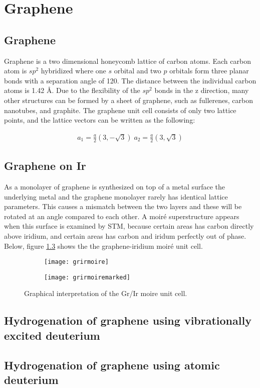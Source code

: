 \chapter{Graphene}

\section{Graphene}

Graphene is a two dimensional honeycomb lattice of carbon atoms. Each carbon atom is $sp^2$ hybridized where one $s$ orbital and two $p$ orbitals form three planar bonds with a separation angle of 120\degree. The distance between the individual carbon atoms is 1.42 Å. Due to the flexibility of the $sp^2$ bonds in the z direction, many other structures can be formed by a sheet of graphene, such as fullerenes, carbon nanotubes, and graphite. The graphene unit cell consists of only two lattice points, and the lattice vectors can be written as the following:

\begin{align*}
  a_1 = \frac{a}{2}(3,-\sqrt{3}) \; a_2 = \frac{a}{2}(3,\sqrt{3})
\end{align*}

\section{Graphene on Ir}

As a monolayer of graphene is synthesized on top of a metal surface the underlying metal and the graphene monolayer rarely has identical lattice parameters. This causes a mismatch between the two layers and these will be rotated at an angle compared to each other. A moiré superstructure appears when this surface is examined by STM, because certain areas has carbon directly above iridium, and certain areas has carbon and iridum perfectly out of phase. Below, figure \ref{moireunitcell} shows the the graphene-iridium moiré unit cell.

\begin{figure}
  \centering
  \begin{subfigure}[b]{0.3\textwidth}
       \texttt{[image: grirmoire]}
       \caption{}
       \label{fig:unmarked}
   \end{subfigure}
   \begin{subfigure}[b]{0.3\textwidth}
        \texttt{[image: grirmoiremarked]}
        \caption{}
        \label{fig:marked}
    \end{subfigure}
  \caption{Graphical interpretation of the Gr/Ir moire unit cell. \cite{Line}}
  \label{moireunitcell}
\end{figure}


\section{Hydrogenation of graphene using vibrationally excited deuterium}


\section{Hydrogenation of graphene using atomic deuterium}
